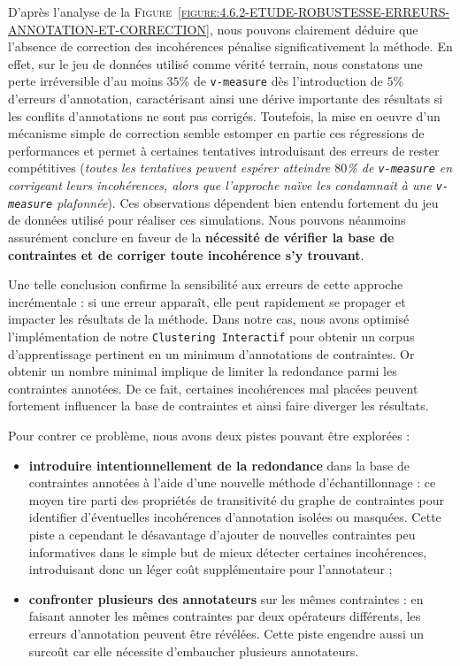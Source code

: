 			D'après l'analyse de la \textsc{Figure~\ref{figure:4.6.2-ETUDE-ROBUSTESSE-ERREURS-ANNOTATION-ET-CORRECTION}}, nous pouvons clairement déduire que l'absence de correction des incohérences pénalise significativement la méthode.
			En effet, sur le jeu de données utilisé comme vérité terrain, nous constatons une perte irréversible d'au moins $35$\% de \texttt{v-measure} dès l'introduction de $5$\% d'erreurs d'annotation, caractérisant ainsi une dérive importante des résultats si les conflits d'annotations ne sont pas corrigés.
			Toutefois, la mise en oeuvre d'un mécanisme simple de correction semble estomper en partie ces régressions de performances et permet à certaines tentatives introduisant des erreurs de rester compétitives
			(\textit{toutes les tentatives peuvent espérer atteindre $80$\% de \texttt{v-measure} en corrigeant leurs incohérences, alors que l'approche naïve les condamnait à une \texttt{v-measure} plafonnée}).
			Ces observations dépendent bien entendu fortement du jeu de données utilisé pour réaliser ces simulations.
			Nous pouvons néanmoins assurément conclure en faveur de la \textbf{nécessité de vérifier la base de contraintes et de corriger toute incohérence s'y trouvant}.
			
			Une telle conclusion confirme la sensibilité aux erreurs de cette approche incrémentale : si une erreur apparaît, elle peut rapidement se propager et impacter les résultats de la méthode.
			Dans notre cas, nous avons optimisé l'implémentation de notre \texttt{Clustering Interactif} pour obtenir un corpus d'apprentissage pertinent en un minimum d'annotations de contraintes.
			Or obtenir un nombre minimal implique de limiter la redondance parmi les contraintes annotées.
			De ce fait, certaines incohérences mal placées peuvent fortement influencer la base de contraintes et ainsi faire diverger les résultats.
			
			Pour contrer ce problème, nous avons deux pistes pouvant être explorées :
			
			\begin{itemize}
				\item \textbf{introduire intentionnellement de la redondance} dans la base de contraintes annotées à l'aide d'une nouvelle méthode d'échantillonnage : ce moyen tire parti des propriétés de transitivité du graphe de contraintes pour identifier d'éventuelles incohérences d'annotation isolées ou masquées.
				Cette piste a cependant le désavantage d'ajouter de nouvelles contraintes peu informatives dans le simple but de mieux détecter certaines incohérences, introduisant donc un léger coût supplémentaire pour l'annotateur ;
				\item \textbf{confronter plusieurs des annotateurs} sur les mêmes contraintes : en faisant annoter les mêmes contraintes par deux opérateurs différents, les erreurs d'annotation peuvent être révélées.
				Cette piste engendre aussi un surcoût car elle nécessite d'embaucher plusieurs annotateurs.
			\end{itemize}
			
